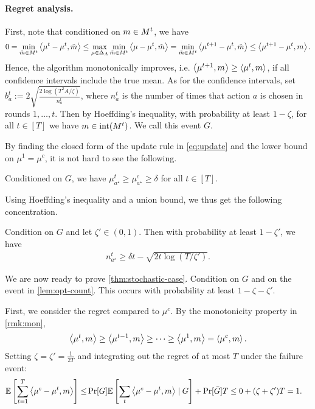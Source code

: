 \paragraph{Regret analysis.}

First, note that conditioned on $m \in M^t$, we have 
\begin{align}
    0 = \min_{\tilde{m} \in M^t} \left\langle \mu^t - \mu^t, \tilde{m} \right\rangle \leq \max_{\mu\in\Delta_A} \min_{\tilde{m} \in M^t} \left\langle \mu - \mu^t, \tilde{m} \right\rangle = \min_{\tilde{m} \in M^t} \left\langle \mu^{t+1} - \mu^t, \tilde{m} \right\rangle \leq \left\langle \mu^{t+1} - \mu^t, m \right\rangle. \label{rmk:mon}
\end{align}
Hence, the algorithm monotonically improves, i.e. $\left\langle \mu^{t+1}, m \right\rangle\geq \left\langle \mu^{t}, m \right\rangle$, if all confidence intervals include the true mean. As for the confidence intervals, set $b_a^t := 2\sqrt{\frac{2\log(T^2A/\zeta)}{n^t_a}}$, where $n^t_a$ is the number of times that action $a$ is chosen in rounds $1,\dots,t$. Then by Hoeffding's inequality, with probability at least $1-\zeta$, for all $t \in [T]$ we have $m \in \text{int}(M^t)$. We call this event $G$.\smallskip

\noindent By finding the closed form of the update rule in \cref{eq:update} and the lower bound on $\mu^1=\mu^c$, it is not hard to see the following.
\begin{lemma} \label{lem:opt-prob}
    Conditioned on $G$, we have $\mu_{a^\star}^{t} \geq \mu^c_{a^\star} \geq \delta$ for all $t\in[T]$.
\end{lemma}
Using Hoeffding's inequality and a union bound, we thus get the following concentration.
\begin{lemma} \label{lem:opt-count}
    Condition on $G$ and let $\zeta' \in (0,1)$. Then with probability at least $1-\zeta'$, we have 
    \begin{align*}
        n_{a^\star}^t \geq \delta t - \sqrt{ 2t \log(T/\zeta') }.
    \end{align*}
\end{lemma}

\smallskip
\noindent We are now ready to prove \cref{thm:stochastic-case}. Condition on $G$ and on the event in \cref{lem:opt-count}. This occurs with probability at least $1-\zeta-\zeta'$.\smallskip

\noindent First, we consider the regret compared to $\mu^c$. By the monotonicity property in \cref{rmk:mon}, 
\begin{align*}
    \left\langle \mu^t, m \right\rangle \geq \left\langle \mu^{t-1}, m \right\rangle \geq \dots \geq \left\langle \mu^1, m \right\rangle = \left\langle \mu^c, m \right\rangle.
\end{align*}
Setting $\zeta = \zeta' = \frac{1}{2T}$ and integrating out the regret of at most $T$ under the failure event:
\begin{align*}
    \mathbb{E}\left[ \sum_{t=1}^T \left\langle \mu^c-\mu^t, m \right\rangle \right] \leq& \Pr[G] \mathbb{E}\left[ \sum_{t} \left\langle \mu^c-\mu^t, m \right\rangle \mid G \right] + \Pr[\bar{G}] T 
    \leq 0 + (\zeta + \zeta')T = 1.
\end{align*}

